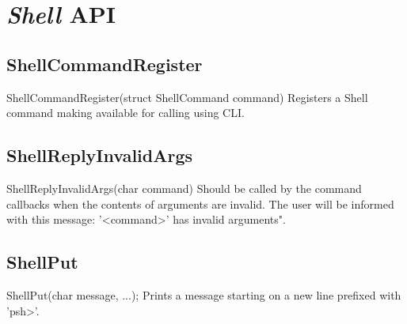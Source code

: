 \section{\textit{Shell} API}

\subsection{ShellCommandRegister}
\label{func:ShellCommandRegister}
\begin{pdfunction}
{ShellCommandRegister(struct ShellCommand command) }
{ 
Registers a Shell command making available for calling using 
CLI. }
\end{pdfunction}

\subsection{ShellReplyInvalidArgs}
\label{func:ShellReplyInvalidArgs}
\begin{pdfunction}
{ShellReplyInvalidArgs(char command) }
{ 
Should be called by the command callbacks when the contents of 
arguments are invalid. The user will be informed with this message: 
'<command>' has invalid arguments". }
\end{pdfunction}

\subsection{ShellPut}
\label{func:ShellPut}
\begin{pdfunction}
{ShellPut(char message, ...); }
{ 
Prints a message starting on a new line prefixed with 'psh>'. }
\end{pdfunction}

